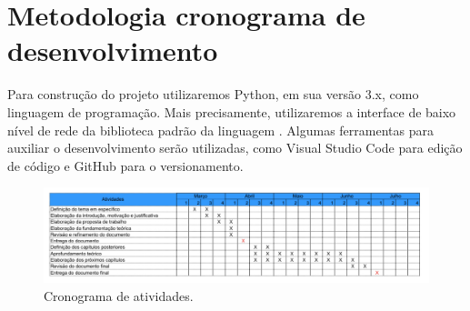 \chapter{\label{chap:chap4} Metodologia cronograma de desenvolvimento}




Para construção do projeto utilizaremos Python, em sua versão 3.x, como linguagem de programação.
Mais precisamente, utilizaremos a interface de baixo nível de rede da biblioteca padrão da linguagem \cite{socketPython}.
Algumas ferramentas para auxiliar o desenvolvimento serão utilizadas, como Visual Studio Code para edição de código e GitHub para o versionamento.

\begin{figure}[htb!]
    \centering\includegraphics[width=1\textwidth]{fig3.pdf}
    \caption%
    {\label{fig:fig3} Cronograma de atividades.}
\end{figure}



